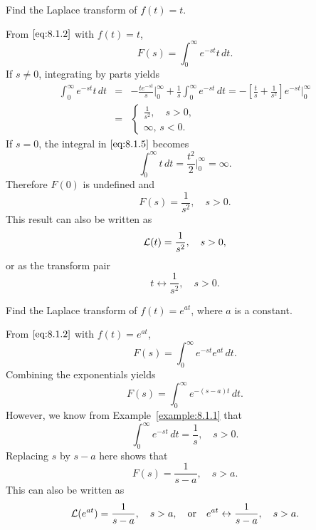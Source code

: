 \documentclass{ximera}
\begin{document}
\begin{example}\label{example:8.1.2}
 Find the Laplace transform of $f(t)=t$.
\begin{explanation}
From $\eqref{eq:8.1.2}$ with $f(t)=t$,
\begin{equation}\label{eq:8.1.5}
F(s)=\int_0^\infty e^{-st}t\,dt.
\end{equation}
If $s\neq 0$,  integrating by parts yields
\begin{eqnarray*}
\int_0^\infty e^{-st}t\,dt&=&-\frac{te^{-st}}{s}\bigg|_0^\infty
+\frac{1}{s}\int_0^\infty e^{-st}\,dt
=-\left[\frac{t}{s}+\frac{1}{s^2}\right]e^{-st}\bigg|_0^\infty
\\&=&\left\{\begin{array}{rr}\frac{1}{s^2},\quad s>0,\\
\infty,\,s<0.\end{array}\right.
\end{eqnarray*}
If $s=0$, the integral in  $\eqref{eq:8.1.5}$ becomes
$$
\int_0^\infty t\,dt=\frac{t^2}{2}\bigg|_0^\infty=\infty.
$$
Therefore $F(0)$ is undefined and
$$
F(s)=\frac{1}{s^2},\quad s>0.
$$
This result can also be written as
$$
{\cal L}(t)=\frac{1}{s^2},\quad s>0,
$$
or as the transform pair
$$
t\leftrightarrow\frac{1}{s^2},\quad s>0.
$$
\end{explanation}
\end{example}

\begin{example}\label{example:8.1.3}
 Find the Laplace transform of $f(t)=e^{at}$, where $a$ is a constant.
\begin{explanation}
From $\eqref{eq:8.1.2}$ with $f(t)=e^{at}$,
$$
F(s)=\int_0^\infty e^{-st}e^{at}\,dt.
$$
Combining the exponentials yields
$$
F(s)=\int_0^\infty e^{-(s-a)t}\,dt.
$$
However, we know from Example~\ref{example:8.1.1}  that
$$
\int_0^\infty e^{-st}\,dt=\frac{1}{s},\quad s>0.
$$
Replacing $s$ by $s-a$ here shows that
$$
F(s)=\frac{1}{s-a},\quad s>a.
$$
This can also be written as
$$
{\cal L}(e^{at})=\frac{1}{s-a},\quad s>a, \quad\text{or}\quad
 e^{at}\leftrightarrow\frac{1}{s-a},\quad s>a.
$$
\end{explanation}
\end{example}
\end{document}
